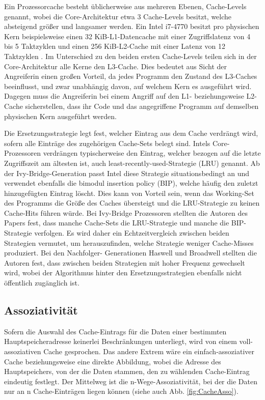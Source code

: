 Ein Prozessorcache besteht üblicherweise aus mehreren Ebenen, Cache-Levels genannt, wobei die Core-Architektur etwa 3 Cache-Levels besitzt, welche absteigend größer und langsamer werden. Ein Intel i7-4770 besitzt pro physischen Kern beispielsweise einen 32 KiB-L1-Datencache mit einer Zugriffslatenz von 4 bis 5 Taktzyklen und einen 256 KiB-L2-Cache mit einer Latenz von 12 Taktzyklen \cite{CacheStatsHaswell}.
Im Unterschied zu den beiden ersten Cache-Levels teilen sich in der Core-Architektur alle Kerne den L3-Cache. 
Dies bedeutet aus Sicht der Angreiferin einen großen Vorteil, da jedes Programm den Zustand des L3-Caches beeinflusst, und zwar unabhängig davon, auf welchem Kern es ausgeführt wird.
Dagegen muss die Angreiferin bei einem Angriff auf den L1- beziehungsweise L2-Cache sicherstellen, dass ihr Code und das angegriffene Programm auf demselben physischen Kern ausgeführt werden.

Die Ersetzungsstrategie legt fest, welcher Eintrag aus dem Cache verdrängt wird, sofern alle Einträge des zugehörigen Cache-Sets belegt sind. 
Intels Core-Prozessoren verdrängen typischerweise den Eintrag, welcher bezogen auf die letzte Zugriffszeit am ältesten ist, auch least-recently-used-Strategie (LRU) genannt. 
Ab der Ivy-Bridge-Generation passt Intel diese Strategie situationsbedingt an \cite{CacheReplacementPolicy} und verwendet ebenfalls  die bimodul insertion policy (BIP), welche häufig den zuletzt hinzugefügten Eintrag löscht. 
Dies kann von Vorteil sein, wenn das Working-Set des Programms die Größe des Caches übersteigt und die LRU-Strategie zu keinen Cache-Hits führen würde.
Bei Ivy-Bridge Prozessoren stellten die Autoren des Papers fest, dass manche Cache-Sets die LRU-Strategie und manche die BIP-Strategie verfolgen. 
Es wird daher ein Echtzeitvergleich zwischen beiden Strategien vermutet, um herauszufinden, welche Strategie weniger Cache-Misses produziert. 
Bei den Nachfolger- Generationen Haswell und Broadwell stellten die Autoren fest, dass zwischen beiden Strategien mit hoher Frequenz gewechselt wird, wobei der Algorithmus hinter den Ersetzungsstrategien ebenfalls nicht öffentlich zugänglich ist.

\subsection{Assoziativität}


Sofern die Auswahl des Cache-Eintrags für die Daten einer bestimmten Hauptspeicheradresse keinerlei Beschränkungen unterliegt, wird von einem voll-assoziativen Cache gesprochen. 
Das andere Extrem wäre ein einfach-assoziativer Cache beziehungsweise eine direkte Abbildung, wobei die Adresse des Hauptspeichers, von der die Daten stammen, den zu wählenden Cache-Eintrag eindeutig festlegt.
Der Mittelweg ist die n-Wege-Assoziativität, bei der die Daten nur an n Cache-Einträgen liegen können (siehe auch Abb. \ref{fig:CacheAsso}).

